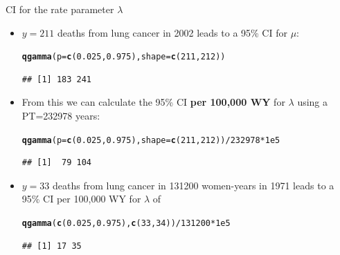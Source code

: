 \documentclass[10pt]{beamer}\usepackage[]{graphicx}\usepackage[]{color}
\makeatletter
\newcommand{\hlnum}[1]{\textcolor[rgb]{0.686,0.059,0.569}{#1}}%
\newcommand{\hlopt}[1]{\textcolor[rgb]{0,0,0}{#1}}%
\newcommand{\hlstd}[1]{\textcolor[rgb]{0.345,0.345,0.345}{#1}}%
\newcommand{\hlkwc}[1]{\textcolor[rgb]{0.333,0.667,0.333}{#1}}%
\newcommand{\hlkwd}[1]{\textcolor[rgb]{0.737,0.353,0.396}{\textbf{#1}}}%
\newenvironment{kframe}{%
 \def\at@end@of@kframe{}%
 \ifinner\ifhmode%
  \def\at@end@of@kframe{\end{minipage}}%
  \begin{minipage}{\columnwidth}%
 \fi\fi%
 \def\FrameCommand##1{\hskip\@totalleftmargin \hskip-\fboxsep
 \colorbox{shadecolor}{##1}\hskip-\fboxsep
     \hskip-\linewidth \hskip-\@totalleftmargin \hskip\columnwidth}%
 \MakeFramed {\advance\hsize-\width
   \@totalleftmargin\z@ \linewidth\hsize
   \@setminipage}}%
 {\par\unskip\endMakeFramed%
 \at@end@of@kframe}
\newenvironment{knitrout}{}{} %
\makeatother
\begin{document}
\begin{frame}[fragile]{CI for the rate  parameter $\lambda$}
	
	
	\begin{itemize}
		\setlength\itemsep{1.5em}
		\small
		\item $y=211$ deaths from lung cancer in 2002 leads to a 95\% CI for $\mu$:
		
\begin{knitrout}\tiny
{}\color{fgcolor}\begin{kframe}
\begin{alltt}
\hlkwd{qgamma}\hlstd{(}\hlkwc{p} \hlstd{=} \hlkwd{c}\hlstd{(}\hlnum{0.025}\hlstd{,} \hlnum{0.975}\hlstd{),} \hlkwc{shape} \hlstd{=} \hlkwd{c}\hlstd{(}\hlnum{211}\hlstd{,} \hlnum{212}\hlstd{))}
\end{alltt}
\begin{verbatim}
## [1] 183 241
\end{verbatim}
\end{kframe}
\end{knitrout}
		
		\pause 
		
		\item From this we can calculate the 95\% CI \textbf{per 100,000 WY} for $\lambda$ using a PT=232978 years:
		
\begin{knitrout}\tiny
{}\color{fgcolor}\begin{kframe}
\begin{alltt}
\hlkwd{qgamma}\hlstd{(}\hlkwc{p} \hlstd{=} \hlkwd{c}\hlstd{(}\hlnum{0.025}\hlstd{,} \hlnum{0.975}\hlstd{),} \hlkwc{shape} \hlstd{=} \hlkwd{c}\hlstd{(}\hlnum{211}\hlstd{,} \hlnum{212}\hlstd{))} \hlopt{/} \hlnum{232978} \hlopt{*} \hlnum{1e5}
\end{alltt}
\begin{verbatim}
## [1]  79 104
\end{verbatim}
\end{kframe}
\end{knitrout}
		
		\pause
		
		\item $y=33$ deaths from lung cancer in 131200 women-years in 1971 leads to a 95\% CI per 100,000 WY for $\lambda$ of
		
\begin{knitrout}\tiny
{}\color{fgcolor}\begin{kframe}
\begin{alltt}
\hlkwd{qgamma}\hlstd{(}\hlkwd{c}\hlstd{(}\hlnum{0.025}\hlstd{,}\hlnum{0.975}\hlstd{),} \hlkwd{c}\hlstd{(}\hlnum{33}\hlstd{,}\hlnum{34}\hlstd{))} \hlopt{/} \hlnum{131200} \hlopt{*} \hlnum{1e5}
\end{alltt}
\begin{verbatim}
## [1] 17 35
\end{verbatim}
\end{kframe}
\end{knitrout}
		

\end{itemize}
\end{frame}
\end{document}
